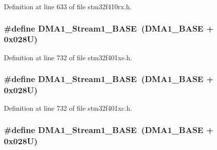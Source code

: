 Definition at line 633 of file stm32f410rx.\+h.

\subsubsection[{\texorpdfstring{D\+M\+A1\+\_\+\+Stream1\+\_\+\+B\+A\+SE}{DMA1_Stream1_BASE}}]{\setlength{\rightskip}{0pt plus 5cm}\#define D\+M\+A1\+\_\+\+Stream1\+\_\+\+B\+A\+SE~({\bf D\+M\+A1\+\_\+\+B\+A\+SE} + 0x028\+U)}\hypertarget{group___peripheral__registers__structures_ga5b4152cef577e37eccc9311d8bdbf3c2}{}\label{group___peripheral__registers__structures_ga5b4152cef577e37eccc9311d8bdbf3c2}


Definition at line 732 of file stm32f401xe.\+h.

\subsubsection[{\texorpdfstring{D\+M\+A1\+\_\+\+Stream1\+\_\+\+B\+A\+SE}{DMA1_Stream1_BASE}}]{\setlength{\rightskip}{0pt plus 5cm}\#define D\+M\+A1\+\_\+\+Stream1\+\_\+\+B\+A\+SE~({\bf D\+M\+A1\+\_\+\+B\+A\+SE} + 0x028\+U)}\hypertarget{group___peripheral__registers__structures_ga5b4152cef577e37eccc9311d8bdbf3c2}{}\label{group___peripheral__registers__structures_ga5b4152cef577e37eccc9311d8bdbf3c2}


Definition at line 732 of file stm32f401xc.\+h.

\subsubsection[{\texorpdfstring{D\+M\+A1\+\_\+\+Stream1\+\_\+\+B\+A\+SE}{DMA1_Stream1_BASE}}]{\setlength{\rightskip}{0pt plus 5cm}\#define D\+M\+A1\+\_\+\+Stream1\+\_\+\+B\+A\+SE~({\bf D\+M\+A1\+\_\+\+B\+A\+SE} + 0x028\+U)}\hypertarget{group___peripheral__registers__structures_ga5b4152cef577e37eccc9311d8bdbf3c2}{}\label{group___peripheral__registers__structures_ga5b4152cef577e37eccc9311d8bdbf3c2}


